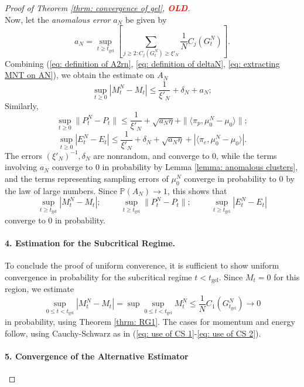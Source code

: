 \begin{proof}[Proof of Theorem \ref{thrm: convergence of gel}, \textcolor{red}{\textbf{OLD}}]
\begin{equation}
   \end{equation} Now, let the \emph{anomalous error} $a_N$ be given by \begin{equation}
       a_N = \sup_{t\geq t_\text{gel}} \left[\sum_{j\geq 2: C_j(G^N_t)\geq \xi'_N} \frac{1}{N}C_j(G^N_t)\right].
   \end{equation}  Combining (\ref{eq: definition of A2rn}, \ref{eq: definition of deltaN}, \ref{eq: extracting MNT on AN}), we obtain the estimate on $A_N$ \begin{equation} \label{eq: estimation of MNT MT}  \sup_{t\geq 0} |M^N_t-M_t| \leq \frac{1}{\xi'_N}+\delta_N + a_N;  \end{equation} Similarly, \begin{equation}
       \sup_{t\geq 0} \|P^N_t-P_t\| \leq \frac{1}{\xi'_N} + \sqrt{a_N \eta} + \|\langle \pi_p, \mu^N_0-\mu_0\rangle \|;
   \end{equation}  \begin{equation}
       \sup_{t\geq 0} |E^N_t-E_t| \leq \frac{1}{\xi'_N} + \delta_N+ \sqrt{a_N \eta} + |\langle \pi_e, \mu^N_0-\mu_0\rangle |.
   \end{equation} The errors $(\xi'_N)^{-1}, \delta_N$ are nonrandom, and converge to 0, while the terms involving $a_N$ converge to $0$ in probability by Lemma \ref{lemma: anomalous clusters}, and the terms representing sampling errors of $\mu^N_0$ converge in probability to $0$ by the law of large numbers. Since $\mathbb{P}(A_N)\rightarrow 1$, this shows that \begin{equation}
       \sup_{t\geq t_\text{gel}} |M^N_t-M_t|; \hspace{1cm} \sup_{t\geq t_\text{gel}} \|P^N_t-P_t\|; \hspace{1cm} \sup_{t\geq t_\text{gel}} |E^N_t-E_t|
   \end{equation} converge to $0$ in probability. 
   \paragraph{4. Estimation for the Subcritical Regime.} To conclude the proof of uniform converence, it is sufficient to show uniform convergence in probability for the subcritical regime $t<t_\text{gel}$. Since $M_t=0$ for this region, we estimate \begin{equation}
       \sup_{0\leq t<t_\text{gel}} |M^N_t-M_t| =\sup \sup_{0\leq t<t_\text{gel}} M^N_t \leq \frac{1}{N}C_1(G^N_{t_\text{gel}}) \rightarrow 0
   \end{equation} in probability, using Theorem \ref{thrm: RG1}. The cases for momentum and energy follow, using Cauchy-Schwarz as in (\ref{eq: use of CS 1}-\ref{eq: use of CS 2}). \paragraph{5. Convergence of the Alternative Estimator}   \end{proof}      
